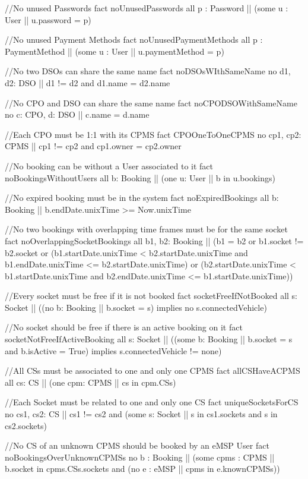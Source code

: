 \documentclass[11pt]{article}
\begin{document}
\begin{ffcode}
//No unused Passwords
fact noUnusedPasswords {
	all p : Password |\textbar| (some u : User |\textbar| u.password = p)
}

//No unused Payment Methods
fact noUnusedPaymentMethods {
	all p : PaymentMethod |\textbar| (some u : User |\textbar| u.paymentMethod = p)
}

//No two DSOs can share the same name
fact noDSOsWIthSameName {
	no d1, d2: DSO |\textbar| d1 != d2 and d1.name = d2.name
}

//No CPO and DSO can share the same name
fact noCPODSOWithSameName {
	no c: CPO, d: DSO |\textbar| c.name = d.name
}

//Each CPO must be 1:1 with its CPMS
fact CPOOneToOneCPMS {
	no cp1, cp2: CPMS |\textbar| cp1 != cp2 and cp1.owner = cp2.owner
}

//No booking can be without a User associated to it
fact noBookingsWithoutUsers {
	all b: Booking |\textbar| (one u: User |\textbar| b in u.bookings)
}

//No expired booking must be in the system
fact noExpiredBookings {
	all b: Booking |\textbar| b.endDate.unixTime >= Now.unixTime
}

//No two bookings with overlapping time frames must be for the same socket
fact noOverlappingSocketBookings {
	all b1, b2: Booking |\textbar| (b1 = b2 or b1.socket != b2.socket or (b1.startDate.unixTime < b2.startDate.unixTime and b1.endDate.unixTime <= b2.startDate.unixTime)
	or (b2.startDate.unixTime < b1.startDate.unixTime and b2.endDate.unixTime <= b1.startDate.unixTime))
}

//Every socket must be free if it is not booked
fact socketFreeIfNotBooked {
	all s: Socket |\textbar| ((no b: Booking |\textbar| b.socket = s)
	implies 
	no s.connectedVehicle)
}

//No socket should be free if there is an active booking on it
fact socketNotFreeIfActiveBooking {
	all s: Socket |\textbar| ((some b: Booking |\textbar| b.socket = s and b.isActive = True)
	implies 
	s.connectedVehicle != none)
}

//All CSs must be associated to one and only one CPMS
fact allCSHaveACPMS {
	all cs: CS |\textbar| (one cpm: CPMS |\textbar| cs in cpm.CSs)
}

//Each Socket must be related to one and only one CS
fact uniqueSocketsForCS {
	no cs1, cs2: CS |\textbar| cs1 != cs2 and (some s: Socket |\textbar| s in cs1.sockets and s in cs2.sockets)
}

//No CS of an unknown CPMS should be booked by an eMSP User
fact noBookingsOverUnknownCPMSs {
	no b : Booking |\textbar| (some cpms : CPMS |\textbar| b.socket in cpms.CSs.sockets and (no e : eMSP |\textbar| cpms in e.knownCPMSs))
}


\end{ffcode}
\end{document}
